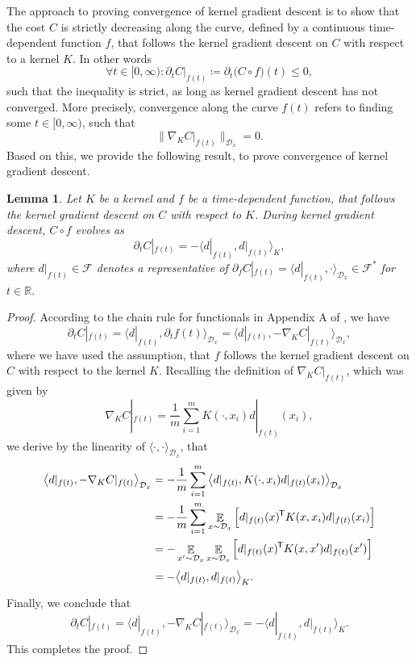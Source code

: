 \documentclass[11pt, a4paper]{article}
\newtheorem{lemma}[theorem]{Lemma}
\newcommand{\R}{\mathbb{R}}
\newcommand{\D}{\mathcal{D}}
\newcommand{\F}{\mathcal{F}}
\newcommand*{\tr}{^{\mkern-1.5mu\mathsf{T}}}
\DeclareMathOperator*{\E}{\mathbb{E}}
\begin{document}
The approach to proving convergence of kernel gradient descent is to show that the cost $C$ is strictly decreasing along the curve, defined by a continuous time-dependent function $f$, that follows the kernel gradient descent on $C$ with respect to a kernel $K$. In other words
\[ \forall t \in [0,\infty) : \partial_tC|_{f(t)} \coloneq \partial_t \big ( C \circ f \big )(t) \leq 0, \]
such that the inequality is strict, as long as kernel gradient descent has not converged. More precisely, convergence along the curve $f(t)$ refers to finding some $t \in [0, \infty)$, such that
\[ \big \| \nabla_K C |_{f(t)}\big \|_{\D_x} = 0. \]
Based on this, we provide the following result, to prove convergence of kernel gradient descent.

\begin{lemma}
Let $K$ be a kernel and $f$ be a time-dependent function, that follows the kernel gradient descent on $C$ with respect to $K$. During kernel gradient descent, $C \circ f$ evolves as 
\[ \partial_tC|_{f(t)} = - \big \langle d|_{f(t)}, d|_{f(t)} \big \rangle_{K}, \]
where $d|_{f(t)} \in \F$ denotes a representative of $\partial_f C|_{f(t)} = \big \langle d|_{f(t)}, \cdot \big \rangle_{\D_x} \in \F^*$ for $t \in \R$.
\end{lemma}

\begin{proof}
According to the chain rule for functionals in Appendix A of \cite{Functionals}, we have
\[ \partial_tC|_{f(t)} = \big \langle d|_{f(t)}, \partial_t f(t) \big \rangle_{\D_x} = \big \langle d|_{f(t)}, - \nabla_K C|_{f(t)} \big \rangle_{\D_x}, \]
where we have used the assumption, that $f$ follows the kernel gradient descent on $C$ with respect to the kernel $K$.
Recalling the definition of $\nabla_K C|_{f(t)}$, which was given by
\[ \nabla_KC|_{f(t)} = \frac{1}{m} \sum_{i=1}^{m} K(\cdot,x_i)d|_{f(t)}(x_i), \]
we derive by the linearity of $\langle \cdot, \cdot \rangle_{\D_x}$, that
\[ \begin{split} 
\big \langle d|_{f(t)}, - \nabla_K C|_{f(t)} \big \rangle_{\D_x} 
&= - \frac{1}{m} \sum_{i=1}^{m} \big \langle d|_{f(t)}, K(\cdot,x_i)d|_{f(t)}(x_i) \big \rangle_{\D_x} \\\
&= - \frac{1}{m} \sum_{i=1}^{m} \E_{x \sim \D_x} \Big [ d|_{f(t)}(x)\tr K(x,x_i)d|_{f(t)}(x_i) \Big ] \\\
&= - \E_{x' \sim \D_x} \E_{x \sim \D_x} \Big [ d|_{f(t)}(x)\tr K(x,x')d|_{f(t)}(x') \Big ] \\\
\textcolor{white}{\Big |}&= - \big \langle d|_{f(t)}, d|_{f(t)} \big \rangle_{K}.
\end{split} \]
Finally, we conclude that
\[ \partial_tC|_{f(t)} = \big \langle d|_{f(t)}, - \nabla_K C|_{f(t)} \big \rangle_{\D_x} = - \big \langle d|_{f(t)}, d|_{f(t)} \big \rangle_{K}. \]
This completes the proof.
\end{proof}
\end{document}
